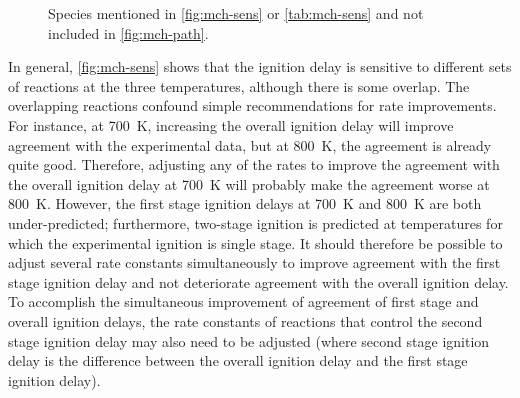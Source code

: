 \documentclass[12pt, letterpaper]{article}
\begin{document}
\begin{figure}\CenterFloatBoxes
    \begin{floatrow}
            {\caption{Sensitivity of the ignition delay to various reaction rates
                for Mix \#1 ($\phi=\num{1.0}$), \SI{25.5}{\bar} and three temperatures
                (\SIlist{700;800;900}{\kelvin}). At \SI{700}{\kelvin}, the sensitivity of the overall
                ignition delay is in red and the sensitivity of the first stage
                ignition delay is in blue. At \SI{800}{\kelvin}, the sensitivity of the overall
                ignition delay is in grey and the sensitivity of the first stage
                ignition delay is in green. At \SI{900}{\kelvin}, the sensitivity of the overall
                ignition delay is in black. Numbers in parentheses represent the
                ranking of the first stage sensitivity indices.}
            \label{fig:mch-sens}}
            {\caption{Species mentioned in \autoref{fig:mch-sens} or
                \autoref{tab:mch-sens} and not included in \autoref{fig:mch-path}.}
            \label{fig:mch-species}}
    \end{floatrow}
\end{figure}

In general, \autoref{fig:mch-sens} shows that the ignition delay
is sensitive to different sets of reactions at the three
temperatures, although there is some overlap. The overlapping
reactions confound simple recommendations for rate improvements.
For instance, at \SI{700}{\kelvin}, increasing the overall ignition
delay will improve agreement with the experimental data, but at
\SI{800}{\kelvin}, the agreement is already quite good. Therefore,
adjusting any of the rates to improve the agreement with the overall
ignition delay at \SI{700}{\kelvin} will probably make the agreement
worse at \SI{800}{\kelvin}. However, the first stage ignition delays
at \SI{700}{\kelvin} and \SI{800}{\kelvin} are both under-predicted;
furthermore, two-stage ignition is predicted at temperatures for
which the experimental ignition is single stage. It should therefore
be possible to adjust several rate constants simultaneously to improve
agreement with the first stage ignition delay and not deteriorate
agreement with the overall ignition delay. To accomplish the
simultaneous improvement of agreement of first stage and overall
ignition delays, the rate constants of reactions that control the
second stage ignition delay may also need to be adjusted (where
second stage ignition delay is the difference between the overall
ignition delay and the first stage ignition delay).
\end{document}
